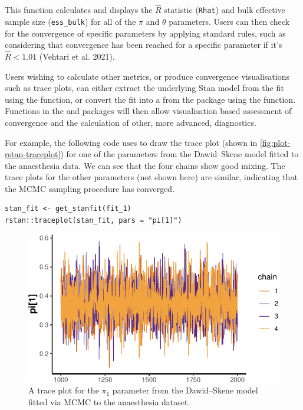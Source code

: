 This function calculates and displays the \(\hat{R}\) statistic (\texttt{Rhat}) and bulk
effective sample size (\texttt{ess\_bulk}) for all of the \(\pi\) and \(\theta\)
parameters. Users can then check for the convergence of specific parameters by
applying standard rules, such as considering that convergence has been reached
for a specific parameter if it's \(\hat{R} < 1.01\) (Vehtari et al. 2021).

Users wishing to calculate other metrics, or produce convergence visualisations
such as trace plots, can either extract the underlying Stan model from the
 fit using the  function, or convert the
fit into a  from the  package using the
 function. Functions in the  and
 packages will then allow visualisation based assessment of
convergence and the calculation of other, more advanced, diagnostics.

For example, the following code uses  to draw the trace plot
(shown in \autoref{fig:plot-rstan-traceplot}) for one of the parameters from
the Dawid--Skene model fitted to the anaesthesia data. We can see that the
four chains show good mixing. The trace plots for the other parameters
(not shown here) are similar, indicating that the MCMC sampling procedure has
converged.

\begin{verbatim}
stan_fit <- get_stanfit(fit_1)
rstan::traceplot(stan_fit, pars = "pi[1]")
\end{verbatim}

\begin{figure}

{\centering \includegraphics{rater_files/figure-latex/plot-rstan-traceplot-1} 

}

\caption{A trace plot for the $\pi_1$ parameter from the Dawid--Skene model fitted via MCMC to the anaesthesia dataset.}\label{fig:plot-rstan-traceplot}
\end{figure}

